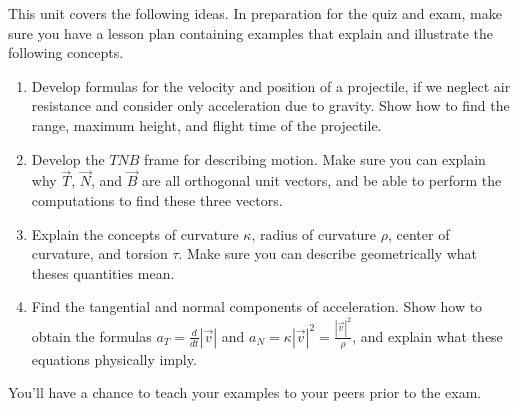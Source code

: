 
\newcommand{\sageurlforcurvature}{http://bmw.byuimath.com/dokuwiki/doku.php?id=curvature_calculator}


\noindent 
This unit covers the following ideas. In preparation for the quiz and exam, make sure you have a lesson plan containing examples that explain and illustrate the following concepts.  
\begin{enumerate}
 \item Develop formulas for the velocity and position of a projectile, if we neglect air resistance and consider only acceleration due to gravity. Show how to find the range, maximum height, and flight time of the projectile.
 \item Develop the $TNB$ frame for describing motion. Make sure you can explain why $\vec T$, $\vec N$, and $\vec B$ are all orthogonal unit vectors, and be able to perform the computations to find these three vectors.
 \item Explain the concepts of curvature $\kappa$, radius of curvature $\rho$, center of curvature, and torsion $\tau$. Make sure you can describe geometrically what theses quantities mean.
 \item Find the tangential and normal components of acceleration. Show how to obtain the formulas $a_T=\frac{d}{dt}|\vec v|$ and $a_N=\kappa |\vec v|^2=\frac{|\vec v|^2}{\rho}$, and explain what these equations physically imply.
\end{enumerate}
You'll have a chance to teach your examples to your peers prior to the exam.

